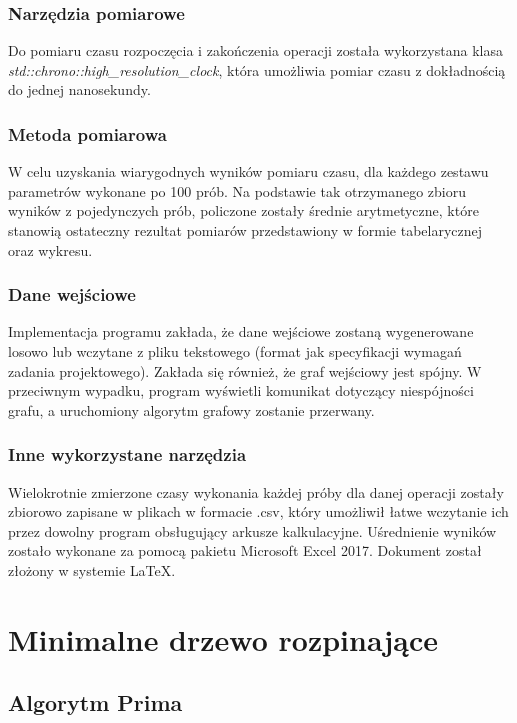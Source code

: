 \documentclass[12pt]{article}
\begin{document}
\subsubsection{Narzędzia pomiarowe}
Do pomiaru czasu rozpoczęcia i zakończenia operacji została wykorzystana klasa \textit{\\std::chrono::high\_resolution\_clock}, która umożliwia pomiar czasu z dokładnością do jednej nanosekundy.

\subsubsection{Metoda pomiarowa}
W celu uzyskania wiarygodnych wyników pomiaru czasu, dla każdego zestawu parametrów wykonane po 100 prób. Na podstawie tak otrzymanego zbioru wyników z pojedynczych prób, policzone zostały średnie arytmetyczne, które stanowią ostateczny rezultat pomiarów przedstawiony w formie tabelarycznej oraz wykresu.

\subsubsection{Dane wejściowe}
Implementacja programu zakłada, że dane wejściowe zostaną wygenerowane losowo lub wczytane z pliku tekstowego (format jak specyfikacji wymagań zadania projektowego). Zakłada się również, że graf wejściowy jest spójny. W przeciwnym wypadku, program wyświetli komunikat dotyczący niespójności grafu, a uruchomiony algorytm grafowy zostanie przerwany.

\subsubsection{Inne wykorzystane narzędzia}
Wielokrotnie zmierzone czasy wykonania każdej próby dla danej operacji zostały zbiorowo zapisane w plikach w formacie .csv, który umożliwił łatwe wczytanie ich przez dowolny program obsługujący arkusze kalkulacyjne. Uśrednienie wyników zostało wykonane za pomocą pakietu Microsoft Excel 2017. Dokument został złożony w systemie {\LaTeX}.

\newpage
\section{Minimalne drzewo rozpinające}

\subsection{Algorytm Prima}
\end{document}
